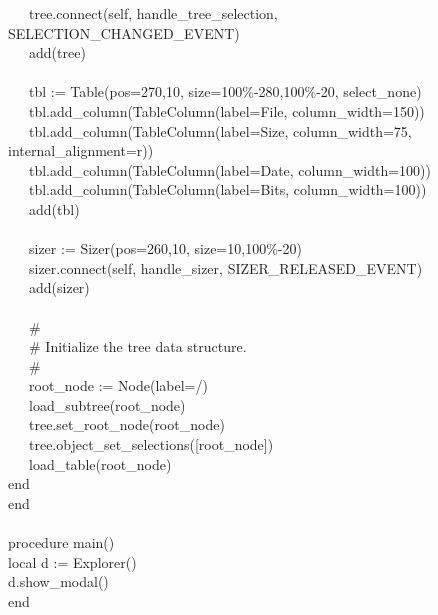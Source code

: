 {\>   \ \ \ tree.connect(self,
{\textquotedbl}handle\_tree\_selection{\textquotedbl},
SELECTION\_CHANGED\_EVENT) \\
\>   \ \ \ add(tree) \\
\ \\
\>   \ \ \ tbl := Table({\textquotedbl}pos=270,10{\textquotedbl},
{\textquotedbl}size=100\%-280,100\%-20{\textquotedbl},
{\textquotedbl}select\_none{\textquotedbl}) \\
\>   \ \ \ tbl.add\_column(TableColumn({\textquotedbl}label=File{\textquotedbl},
{\textquotedbl}column\_width=150{\textquotedbl})) \\
\>   \ \ \ tbl.add\_column(TableColumn({\textquotedbl}label=Size{\textquotedbl},
{\textquotedbl}column\_width=75{\textquotedbl},
{\textquotedbl}internal\_alignment=r{\textquotedbl})) \\
\>   \ \ \ tbl.add\_column(TableColumn({\textquotedbl}label=Date{\textquotedbl},
{\textquotedbl}column\_width=100{\textquotedbl})) \\
\>   \ \ \ tbl.add\_column(TableColumn({\textquotedbl}label=Bits{\textquotedbl},
{\textquotedbl}column\_width=100{\textquotedbl})) \\
\>   \ \ \ add(tbl) \\
\ \\
\>   \ \ \ sizer := Sizer({\textquotedbl}pos=260,10{\textquotedbl},
{\textquotedbl}size=10,100\%-20{\textquotedbl}) \\
\>   \ \ \ sizer.connect(self,
{\textquotedbl}handle\_sizer{\textquotedbl}, SIZER\_RELEASED\_EVENT) \\
\>   \ \ \ add(sizer) \\
\ \\
\>   \ \ \ \# \\
\>   \ \ \ \# Initialize the tree data structure. \\
\>   \ \ \ \# \\
\>   \ \ \ root\_node := Node({\textquotedbl}label=/{\textquotedbl}) \\
\>   \ \ \ load\_subtree(root\_node) \\
\>   \ \ \ tree.set\_root\_node(root\_node) \\
\>   \ \ \ tree.object\_set\_selections([root\_node]) \\
\>   \ \ \ load\_table(root\_node) \\
\>   end \\
end \\
\ \\
procedure main() \\
\>   local d := Explorer() \\
\>   d.show\_modal() \\
end
}

